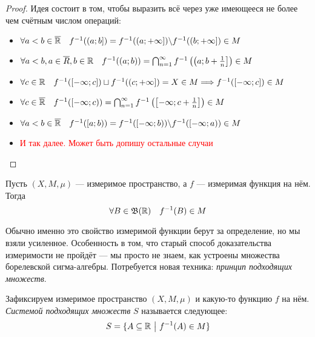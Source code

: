 \begin{proof}
	Идея состоит в том, чтобы выразить всё через уже имеющееся не более чем счётным числом операций:
	\begin{itemize}
		\item $\forall a < b \in \overline{\mathbb{R}} \quad f^{-1}(\left(a; b\right]) = f^{-1}(\left(a; +\infty\right]) \backslash f^{-1}(\left(b; +\infty\right]) \in M$
		
		\item $\forall a < b, a \in \overline{R}, b \in \mathbb{R} \quad  f^{-1}((a; b)) = \bigcap_{n = 1}^\infty f^{-1}\left(\left(a; b + \frac{1}{n}\right]\right) \in M$
		
		\item $\forall c \in \mathbb{R} \quad f^{-1}([-\infty; c]) \sqcup f^{-1}(\left(c; +\infty\right]) = X \in M \Longrightarrow f^{-1}([-\infty; c]) \in M$
		
		\item $\forall c \in \overline{\mathbb{R}} \quad f^{-1}(\left[-\infty; c\right)) = \bigcap_{n = 1}^\infty f^{-1}\left(\left[-\infty; c + \frac{1}{n}\right]\right) \in M$
		
		\item $\forall a < b \in \overline{\mathbb{R}} \quad f^{-1}(\left[a; b\right)) = f^{-1}(\left[-\infty; b\right)) \backslash f^{-1}(\left[-\infty; a\right)) \in M$
		
		\item \textcolor{red}{И так далее. Может быть допишу остальные случаи}
	\end{itemize}
\end{proof}

\begin{theorem}
	Пусть $(X, M, \mu)$ --- измеримое пространство, а $f$ --- измеримая функция на нём. Тогда
	\[
		\forall B \in \mathfrak{B}(\mathbb{R}) \quad f^{-1}(B) \in M
	\]
\end{theorem}

\begin{note}
	Обычно именно это свойство измеримой функции берут за определение, но мы взяли усиленное. Особенность в том, что старый способ доказательства измеримости не пройдёт --- мы просто не знаем, как устроены множества борелевской сигма-алгебры. Потребуется новая техника: \textit{принцип подходящих множеств}.
\end{note}

\begin{definition}
	Зафиксируем измеримое пространство $(X, M, \mu)$ и какую-то функцию $f$ на нём. \textit{Системой подходящих множеств} $S$ называется следующее:
	\[
		S = \{A \subseteq \mathbb{R} \ \big|\  f^{-1}(A) \in M\}
	\]
\end{definition}

